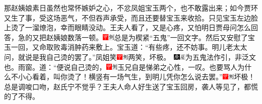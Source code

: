 那赵姨娘素日虽然也常怀嫉妒之心，不忿凤姐宝玉两个，也不敢露出来；如今贾环又生了事，受这场恶气，不但吞声承受，而且还要替宝玉来收拾。只见宝玉左边脸上烫了一溜燎泡，幸而眼睛没动。王夫人看了，又是心疼，又怕明日贾母问怎么回答，急的又把赵姨娘数落一顿。{\includegraphics[width=3mm]{../Images/00002}\includegraphics[width=3mm]{../Images/00011}\footnotesize \kaishu 总是为楔紧“五鬼”一回文字。}然后又安慰了宝玉一回，又命取败毒消肿药来敷上。宝玉道：“有些疼，还不妨事。明儿老太太问，就说是我自己烫的罢了。”凤姐笑{\includegraphics[width=3mm]{../Images/00002}\includegraphics[width=3mm]{../Images/00011}\footnotesize \kaishu 两笑，坏极。　\includegraphics[width=3mm]{../Images/00004}\includegraphics[width=3mm]{../Images/00010}\footnotesize \kaishu 为五鬼法作引，非泛文也。雨窗。}道：“便说自己烫的，{\includegraphics[width=3mm]{../Images/00002}\includegraphics[width=3mm]{../Images/00011}\footnotesize \kaishu 玉兄自是悌弟之心性，一叹。}也要骂人为什么不小心看着，叫你烫了！横竖有一场气生，到明儿凭你怎么说去罢。”{\includegraphics[width=3mm]{../Images/00002}\includegraphics[width=3mm]{../Images/00011}\footnotesize \kaishu 坏极！总是调唆口吻，赵氏宁不觉乎？}王夫人命人好生送了宝玉回房，袭人等见了，都慌的了不得。

